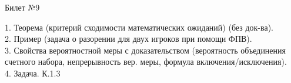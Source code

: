 \documentclass[preview]{standalone}
\begin{document}
 
\begin{center} {\Large Билет №9} \end{center} 

1.  Теорема (критерий сходимости математических ожиданий) (без док-ва).\\

2.  Пример (задача о разорении для двух игроков при помощи ФПВ). \\

3.  Свойства  вероятностной меры с доказательством (вероятность объединения счетного набора, непрерывность вер. меры, формула включения/исключения).\\

4. Задача. К.1.3\\
\end{document}

